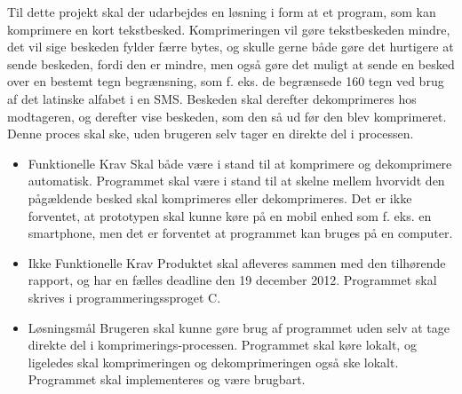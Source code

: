 Til dette projekt skal der udarbejdes en løsning i form at et program, som kan komprimere en kort tekstbesked. Komprimeringen vil gøre tekstbeskeden mindre, det vil sige beskeden fylder færre bytes, og skulle gerne både gøre det hurtigere at sende beskeden, fordi den er mindre, men også gøre det muligt at sende en besked over en bestemt tegn begrænsning, som f. eks. de begrænsede 160 tegn ved brug af det latinske alfabet i en SMS. Beskeden skal derefter dekomprimeres hos modtageren, og derefter vise beskeden, som den så ud før den blev komprimeret. Denne proces skal ske, uden brugeren selv tager en direkte del i processen.

\begin {itemize}
\item Funktionelle Krav
\subitem Skal både være i stand til at komprimere og dekomprimere automatisk.
\subitem Programmet skal være i stand til at skelne mellem hvorvidt den pågældende besked skal komprimeres eller dekomprimeres.
\subitem Det er ikke forventet, at prototypen skal kunne køre på en mobil enhed som f. eks. en smartphone, men det er forventet at programmet kan bruges på en computer.

\item Ikke Funktionelle Krav
\subitem Produktet skal afleveres sammen med den tilhørende rapport, og har en fælles deadline den 19 december 2012.
\subitem Programmet skal skrives i programmeringssproget C.

\item Løsningsmål
\subitem Brugeren skal kunne gøre brug af programmet uden selv at tage direkte del i komprimerings-processen.
\subitem Programmet skal køre lokalt, og ligeledes skal komprimeringen og dekomprimeringen også ske lokalt.
\subitem Programmet skal implementeres og være brugbart.
\end{itemize}
